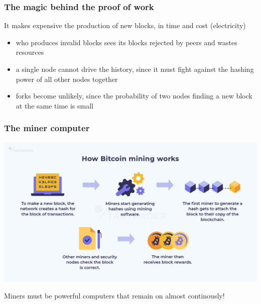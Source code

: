 \documentclass[11pt]{beamer}  %
\begin{document}
\begin{frame}\frametitle{The magic behind the proof of work}

  \begin{greenbox}{}
    It makes expensive the production of new blocks, in time and cost (electricity)
    \begin{itemize}
    \item who produces invalid blocks sees its blocks rejected by peers and wastes resources
    \item a single node cannot drive the history, since it must fight against
      the hashing power of all other nodes together
    \item forks become unlikely, since the probability of two nodes finding a new block at the same time is small
    \end{itemize}
  \end{greenbox}

\end{frame}

\begin{frame}\frametitle{The miner computer}

  \begin{center}
    \includegraphics[scale=0.28,clip=false]{pictures/miner.png}
  \end{center}

  \begin{greenbox}{}
    Miners must be powerful computers that remain on almost continously!
  \end{greenbox}

\end{frame}
\end{document}
